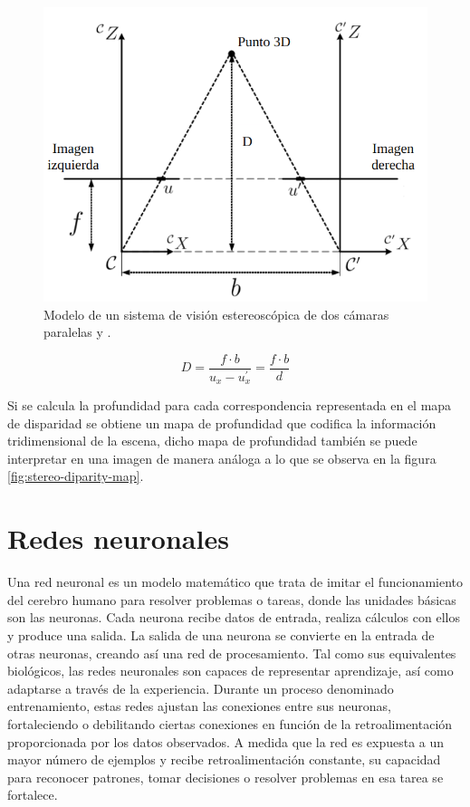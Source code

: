 \begin{figure}[H]
    \centering
    \includegraphics[scale=0.4]{partes/img/stereo-trangulation.png}
    \caption[Modelo de un sistema de visión estereoscópica de dos cámaras paralelas  y .]{Modelo de un sistema de visión estereoscópica de dos cámaras paralelas  y \footnotemark.}
    \label{fig:stereo-triang}
\end{figure}

\begin{equation}
    \label{eq:stereo-depth}
    D =  \frac{f \cdot b}{u_x - u^{\prime}_x} = \frac{f \cdot b}{d}
\end{equation}

Si se calcula la profundidad  para cada correspondencia representada en el mapa de disparidad se obtiene un mapa de profundidad que codifica la información tridimensional de la escena, dicho mapa de profundidad también se puede interpretar en una imagen de manera análoga a lo que se observa en la figura \ref{fig:stereo-diparity-map}.

\section{Redes neuronales}
\label{sec:teo-neural}

Una red neuronal es un modelo matemático que trata de imitar el funcionamiento del cerebro humano para resolver problemas o tareas, donde las unidades básicas son las neuronas. Cada neurona recibe datos de entrada, realiza cálculos con ellos y produce una salida. La salida de una neurona se convierte en la entrada de otras neuronas, creando así una red de procesamiento. Tal como sus equivalentes biológicos, las redes neuronales son capaces de representar aprendizaje, así como adaptarse a través de la experiencia. Durante un proceso denominado entrenamiento, estas redes ajustan las conexiones entre sus neuronas, fortaleciendo o debilitando ciertas conexiones en función de la retroalimentación proporcionada por los datos observados. A medida que la red es expuesta a un mayor número de ejemplos y recibe retroalimentación constante, su capacidad para reconocer patrones, tomar decisiones o resolver problemas en esa tarea se fortalece.

